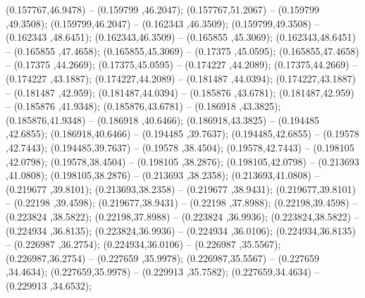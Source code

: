  (0.157767,46.9478) -- (0.159799 ,46.2047);
 (0.157767,51.2067) -- (0.159799 ,49.3508);
 (0.159799,46.2047) -- (0.162343 ,46.3509);
 (0.159799,49.3508) -- (0.162343 ,48.6451);
 (0.162343,46.3509) -- (0.165855 ,45.3069);
 (0.162343,48.6451) -- (0.165855 ,47.4658);
 (0.165855,45.3069) -- (0.17375 ,45.0595);
 (0.165855,47.4658) -- (0.17375 ,44.2669);
 (0.17375,45.0595) -- (0.174227 ,44.2089);
 (0.17375,44.2669) -- (0.174227 ,43.1887);
 (0.174227,44.2089) -- (0.181487 ,44.0394);
 (0.174227,43.1887) -- (0.181487 ,42.959);
 (0.181487,44.0394) -- (0.185876 ,43.6781);
 (0.181487,42.959) -- (0.185876 ,41.9348);
 (0.185876,43.6781) -- (0.186918 ,43.3825);
 (0.185876,41.9348) -- (0.186918 ,40.6466);
 (0.186918,43.3825) -- (0.194485 ,42.6855);
 (0.186918,40.6466) -- (0.194485 ,39.7637);
 (0.194485,42.6855) -- (0.19578 ,42.7443);
 (0.194485,39.7637) -- (0.19578 ,38.4504);
 (0.19578,42.7443) -- (0.198105 ,42.0798);
 (0.19578,38.4504) -- (0.198105 ,38.2876);
 (0.198105,42.0798) -- (0.213693 ,41.0808);
 (0.198105,38.2876) -- (0.213693 ,38.2358);
 (0.213693,41.0808) -- (0.219677 ,39.8101);
 (0.213693,38.2358) -- (0.219677 ,38.9431);
 (0.219677,39.8101) -- (0.22198 ,39.4598);
 (0.219677,38.9431) -- (0.22198 ,37.8988);
 (0.22198,39.4598) -- (0.223824 ,38.5822);
 (0.22198,37.8988) -- (0.223824 ,36.9936);
 (0.223824,38.5822) -- (0.224934 ,36.8135);
 (0.223824,36.9936) -- (0.224934 ,36.0106);
 (0.224934,36.8135) -- (0.226987 ,36.2754);
 (0.224934,36.0106) -- (0.226987 ,35.5567);
 (0.226987,36.2754) -- (0.227659 ,35.9978);
 (0.226987,35.5567) -- (0.227659 ,34.4634);
 (0.227659,35.9978) -- (0.229913 ,35.7582);
 (0.227659,34.4634) -- (0.229913 ,34.6532);
